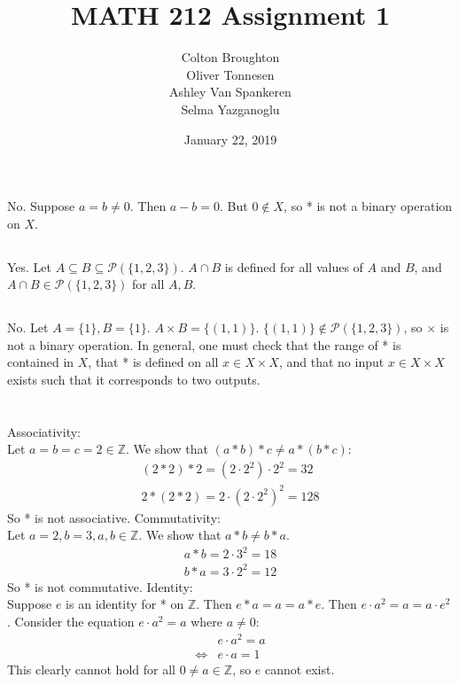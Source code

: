 \documentclass{article}
\title{MATH 212 Assignment 1}
\author{Colton Broughton\\
		Oliver Tonnesen\\
		Ashley Van Spankeren\\
		Selma Yazganoglu}
\date{January 22, 2019}
\begin{document}
\maketitle
\newcommand{\msout}[1]{\text{\sout{\ensuremath{#1}}}}
\newcommand{\heart}{\ensuremath\heartsuit}
\renewcommand{\thesubsection}{\thesection.\alph{subsection}}
\section{} %
\subsection{} %
No. Suppose $a=b\neq0$. Then $a-b=0$. But $0\not\in X$, so * is not a binary
operation on $X$.
\subsection{} %
Yes. Let $A\subseteq B\subseteq\mathcal{P}(\{1,2,3\})$. $A\cap B$ is defined
for all values of $A$ and $B$, and $A\cap B\in\mathcal{P}(\{1,2,3\})$ for all $A,B$.
\subsection{} %
No. Let $A=\{1\},B=\{1\}$. $A\times B=\{(1,1)\}$.
$\{(1,1)\}\not\in\mathcal{P}(\{1,2,3\})$, so $\times$ is not a binary operation.
\newline
In general, one must check that the range of * is contained in $X$, that * is
defined on all $x\in X\times X$, and that no input $x\in X\times X$ exists such
that it corresponds to two outputs.
\section{} %
Associativity:\\
Let $a=b=c=2\in\mathbb{Z}$. We show that $(a*b)*c\neq a*(b*c)$:
\begin{align*}
	(2*2)*2=(2\cdot2^2)\cdot2^2=32\\
	2*(2*2)=2\cdot(2\cdot2^2)^2=128
\end{align*}
So * is not associative.
\newline
\newline
Commutativity:\\
Let $a=2,b=3,a,b\in\mathbb{Z}$. We show that $a*b\neq b*a$.
\begin{align*}
	a*b=2\cdot3^2=18\\
	b*a=3\cdot2^2=12
\end{align*}
So * is not commutative.
\newline
\newline
Identity:\\
Suppose $e$ is an identity for * on $\mathbb{Z}$. Then $e*a=a=a*e$.
Then $e\cdot a^2=a=a\cdot e^2$. Consider the equation $e\cdot a^2=a$ where
$a\neq0$:
\begin{align*}
	&e\cdot a^2=a\\
	\iff&e\cdot a=1
\end{align*}
This clearly cannot hold for all $0\neq a\in\mathbb{Z}$, so $e$ cannot exist.
\end{document}
